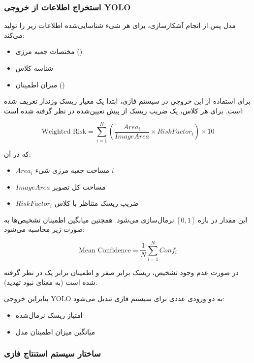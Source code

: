 \documentclass[a4paper, 10pt, twocolumn]{article}
\begin{document}
	
	
	\subsubsection{استخراج اطلاعات از خروجی YOLO}
	
	مدل  پس از انجام آشکارسازی، برای هر شیء شناسایی‌شده اطلاعات زیر را تولید می‌کند:
	
	\begin{itemize}
		\item مختصات جعبه مرزی ()
		\item شناسه کلاس
		\item میزان اطمینان ()
	\end{itemize}
	
	برای استفاده از این خروجی در سیستم فازی، ابتدا یک معیار ریسک وزندار تعریف شده است. برای هر کلاس، یک ضریب ریسک از پیش تعیین‌شده در نظر گرفته شده است:
	
	\[
	\text{Weighted Risk} = \sum_{i=1}^{N} 
	\left(
	\frac{Area_i}{ImageArea}
	\times RiskFactor_i
	\right)
	\times 10
	\]
	
	که در آن:
	
	\begin{itemize}
		\item $Area_i$ مساحت جعبه مرزی شیء $i$
		\item $ImageArea$ مساحت کل تصویر
		\item $RiskFactor_i$ ضریب ریسک متناظر با کلاس
	\end{itemize}
	
	این مقدار در بازه $[0,1]$ نرمال‌سازی می‌شود. همچنین میانگین اطمینان تشخیص‌ها به صورت زیر محاسبه می‌شود:
	
	\[
	\text{Mean Confidence} = \frac{1}{N} \sum_{i=1}^{N} Conf_i
	\]
	
	در صورت عدم وجود تشخیص، ریسک برابر صفر و اطمینان برابر یک در نظر گرفته شده است (به معنای نبود تهدید).
	
	بنابراین خروجی YOLO به دو ورودی عددی برای سیستم فازی تبدیل می‌شود:
	
	\begin{itemize}
		\item امتیاز ریسک نرمال‌شده
		\item میانگین میزان اطمینان مدل
	\end{itemize}
	
	
	\subsubsection{ساختار سیستم استنتاج فازی}
	
\end{document}
